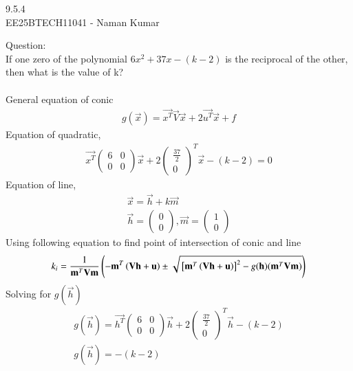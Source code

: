 \documentclass[a5paper,10pt]{article}
\author{EE25BTECH11041-Naman Kumar }
\begin{document}
\begin{center}
    \huge{9.5.4}\\
    \large{EE25BTECH11041 - Naman Kumar}
\end{center}
Question:\\
If one zero of the polynomial $6x^2 + 37x-(k-2)$ is the reciprocal of the other, then what is the value of k?\\
\solution \\
General equation of conic
\begin{align}
    g(\vec{x})=\vec{x^T}\vec{V}\vec{x}+2\vec{u^T}\vec{x}+f
\end{align}
Equation of quadratic,
\begin{align}
    \vec{x^T}\begin{pmatrix}6&0\\0&0\end{pmatrix}\vec{x}+2\begin{pmatrix}\frac{37}{2}\\0\end{pmatrix}^T\vec{x}-(k-2)=0
\end{align}
Equation of line,
\begin{align}
    \vec{x}=\vec{h}+k\vec{m} \\
    \vec{h}=\begin{pmatrix}0\\0\end{pmatrix},\vec{m}=\begin{pmatrix}1\\ 0 \end{pmatrix}
\end{align}
Using following equation to find point of intersection of conic and line
\begin{align}
    k_i=\frac{1}{\mathbf{m}^T\mathbf{V}\mathbf{m}}\left(-\mathbf{m}^T\left(\mathbf{V}\mathbf{h}+\mathbf{u}\right) \pm \sqrt{{}\left[\mathbf{m}^T\left(\mathbf{V}\mathbf{h}+\mathbf{u}\right)\right]^2-g(\mathbf{h})(\mathbf{m}^T\mathbf{V}\mathbf{m})} \right) \label{main}
\end{align}
Solving for $g(\vec{h})$
\begin{align}
    g(\vec{h})=\vec{h^T}\begin{pmatrix}6&0\\0&0\end{pmatrix}\vec{h}+2\begin{pmatrix}\frac{37}{2}\\0\end{pmatrix}^T\vec{h}-(k-2) \\
    g(\vec{h})=-(k-2) \label{g}
\end{align}
\end{document}
